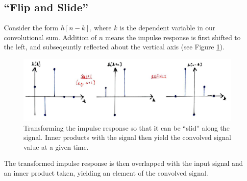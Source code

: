 \subsection{``Flip and Slide''}
%
Consider the form $h[n-k]$, where $k$ is the dependent variable in our convolutional
sum. Addition of $n$ means the impulse response is first shifted to the left, and
subseqeuntly reflected about the vertical axis (see Figure
\ref{fig::lecture_3_flip_and_slide}).
%
\begin{figure}[H]
  \includegraphics[width=\textwidth]{images/lecture_3_flip_and_slide.JPG}
  \caption{
    Transforming the impulse response so that it can be ``slid'' along the
    signal. Inner products with the signal then yield the convolved signal
    value at a given time.
  }
  \label{fig::lecture_3_flip_and_slide}
\end{figure}
%
The transformed impulse response is then overlapped with the input
signal and an inner product taken, yielding an element of the convolved
signal.

